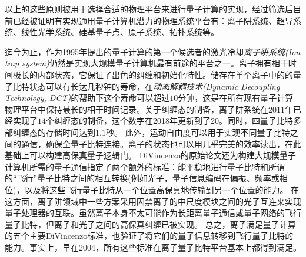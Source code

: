 以上的这些原则被用于选择合适的物理平台来进行量子计算的实现，经过筛选后目前已经被证明有实现通用量子计算机潜力的物理系统平台有：离子阱系统、超导系统、线性光学系统、硅基量子点、原子系统、拓扑系统等。

迄今为止，作为1995年提出的量子计算的第一个候选者的激光冷却\emph{离子阱系统(Ion trap system)}仍然是实现大规模量子计算机最有前途的平台之一。离子拥有相干时间极长\cite[]{Fisk_Sellars_Lawn_Coles_1997}的内部状态，它保证了出色的纠缠和初始化特性\cite[]{Blatt_Wineland_2008}。储存在单个离子中的的量子比特状态可以有长达几秒钟的寿命\cite[]{Langer_Ozeri_Jost_Chiaverini_DeMarco_Ben_Kish_Blakestad_Britton_Hume_Itano_et_al_2005}，在\emph{动态解耦技术(Dynamic Decoupling Technology, DCT)}的帮助下这个寿命可以超过$10$分钟\cite[]{Wang_Um_Zhang_An_Lyu_Zhang_Duan_Yum_Kim_2017}，这是在所有现有量子计算物理平台中保持最长的相干时间记录。关于纠缠态的制备，离子阱系统在2011年已经实现了$14$个纠缠态的制备\cite[]{Monz_Schindler_Barreiro_Chwalla_Nigg_Coish_Harlander_Hänsel_Hennrich_Blatt_2011}，这个数字在2018年更新到了20\cite[]{Friis_Marty_Maier_Hempel_Holzäpfel_Jurcevic_Plenio_Huber_Roos_Blatt_et_al_2018}。同时，四量子比特多部纠缠态的存储时间达到$1.1$秒\cite[]{Kaufmann_Ruster_Schmiegelow_Luda_Kaushal_Schulz_von_Lindenfels_Schmidt_Kaler_Poschinger_2017}。
此外，运动自由度可以用于实现不同量子比特之间的通信，确保全量子比特连接\cite[]{Debnath_Linke_Figgatt_Landsman_Wright_Monroe_2016}。离子的状态也可以用几乎完美的效率读出\cite[]{Myerson_Szwer_Webster_Allcock_Curtis_Imreh_Sherman_Stacey_Steane_Lucas_2008}，在此基础上可以构建高保真量子逻辑门\cite[]{Ballance_Harty_Linke_Sepiol_Lucas_2016}。
DiVincenzo的原始论文还为构建大规模量子计算机所需的量子通信指定了两个额外的标准：能平稳地进行量子比特和所谓的“飞行”量子比特之间的相互转换(例如光子，量子信息编码在偏振、频率或相位)，以及将这些飞行量子比特从一个位置高保真地传输到另一个位置的能力。
在这方面，离子阱领域中一些方案采用囚禁离子的中尺度模块之间的光子互连来实现量子处理器的互联\cite[]{Monroe_Raussendorf_Ruthven_Brown_Maunz_Duan_Kim_2014}。虽然离子本身不太可能作为长距离量子通信或量子网络的飞行量子比特，但离子和光子之间的高保真纠缠已被实现\cite[]{Moehring_Blinov_Madsen_Duan_Monroe_2004}。
总之，离子满足量子计算的五个主要DiVincenzo标准，也验证了将它们的量子信息转移到飞行量子比特的能力。事实上，早在2004，所有这些标准在离子量子比特平台基本上都得到满足\cite[]{Leibfried_DeMarco_Meyer_Lucas_Barrett_Britton_Itano_Jelenković_Langer_Rosenband_et_al_2003,Moehring_Blinov_Madsen_Duan_Monroe_2004}。

